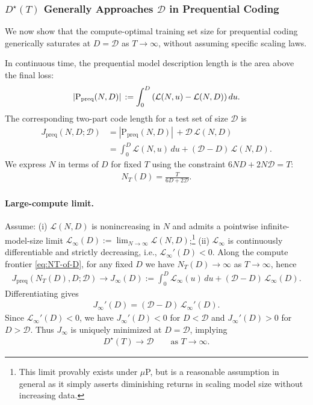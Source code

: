 \documentclass[twoside]{article}
\renewcommand{\L}{\mathcal{L}}
\newcommand{\D}{\mathcal{D}}
\renewcommand{\L}{\mathcal{L}}
\begin{document}
\subsubsection{$D^\star(T)$ Generally Approaches $\D$ in Prequential Coding}
\label{app:prequential-saturation}

We now show that the compute-optimal training set size for prequential coding generically saturates at $D = \D$ as $T \to \infty$, without assuming specific scaling laws.

In continuous time, the prequential model description length is the area above the final loss:
\begin{align}
    |\mathrm{P}_{\mathrm{preq}}(N, D)|\, := \int_{0}^{D} \qty( \L(N, u) - \L(N, D) )\, du.
\end{align}
The corresponding two-part code length for a test set of size $\D$ is
\begin{align}
    J_{\mathrm{preq}}(N, D; \D)
    &= |\mathrm{P}_{\mathrm{preq}}(N, D)|\, + \D\, \L(N, D) \nonumber\\
    &= \int_{0}^{D} \L(N, u)\, du + (\D - D)\, \L(N, D).
    \label{eq:Jpreq-cont}
\end{align}
We express $N$ in terms of $D$ for fixed $T$ using the constraint $6ND + 2N\D = T$:
\begin{align}
    N_T(D) = \frac{T}{6D + 2\D}.
    \label{eq:NT-of-D}
\end{align}

\paragraph{Large-compute limit.}
Assume: (i) $\L(N, D)$ is nonincreasing in $N$ and admits a pointwise infinite-model-size limit $\L_\infty(D) := \lim_{N \to \infty} \L(N, D)$;\footnote{This limit provably exists under $\mu$P, but is a reasonable assumption in general as it simply asserts diminishing returns in scaling model size without increasing data.} (ii) $\L_\infty$ is continuously differentiable and strictly decreasing, i.e., $\L_\infty'(D) < 0$. Along the compute frontier \eqref{eq:NT-of-D}, for any fixed $D$ we have $N_T(D) \to \infty$ as $T \to \infty$, hence
\begin{align}
    J_{\mathrm{preq}}(N_T(D), D; \D) \to J_\infty(D) := \int_{0}^{D} \L_\infty(u)\, du + (\D - D)\, \L_\infty(D).
\end{align}
Differentiating gives
\begin{align}
    J_\infty'(D) = (\D - D)\, \L_\infty'(D).
\end{align}
Since $\L_\infty'(D) < 0$, we have $J_\infty'(D) < 0$ for $D < \D$ and $J_\infty'(D) > 0$ for $D > \D$. Thus $J_\infty$ is uniquely minimized at $D = \D$, implying
\begin{align}
    D^\star(T) \to \D \qquad \text{as } T \to \infty.
\end{align}
\end{document}

